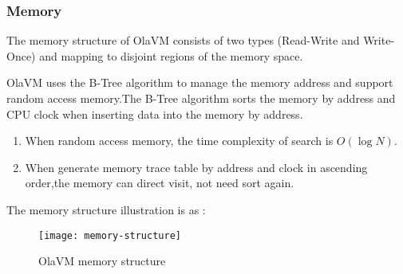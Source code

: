 \subsubsection{Memory}\label{subsec: ola-memory}
The memory structure of OlaVM consists of two types (Read-Write and Write-Once) and mapping to disjoint regions of the memory space.
\begin{table}[!ht]
    \centering {}
    \caption{Memory segment range}
    \label{table:memory-segment-range}
\end{table}


OlaVM uses the B-Tree algorithm to manage the memory address and support random access memory.The B-Tree algorithm sorts the memory by address and CPU clock when inserting data into the memory by address.
\begin{enumerate}
    \item When random access memory, the time complexity of search is $O(\log N)$.
    \item When generate memory trace table by address and clock in ascending order,the memory can direct visit, not need sort again.
\end{enumerate}

The memory structure illustration is as :
\begin{figure}[!htp]
    \centering
    \texttt{[image: memory-structure]}
    \caption{OlaVM memory structure}
    \label{fig: B-tree-memory}
\end{figure}
